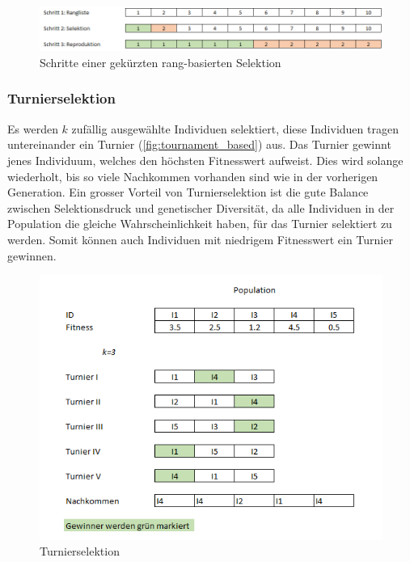         \begin{figure}[H]
          \includegraphics[width=\textwidth,center]{graphics/truncated_rank_based_selection}
          \caption{Schritte einer gekürzten rang-basierten Selektion\label{fig:truncated_rank_based_selection}}
        \end{figure}

      \subsubsection{Turnierselektion\label{subsub:Turnier}}

        Es werden \(k\) zufällig ausgewählte Individuen selektiert,
        diese Individuen tragen untereinander ein Turnier (\vref{fig:tournament_based}) aus.
        Das Turnier gewinnt jenes Individuum, welches den höchsten Fitnesswert aufweist.
        Dies wird solange wiederholt, bis so viele Nachkommen vorhanden sind wie in der vorherigen Generation.
        Ein grosser Vorteil von Turnierselektion ist die gute Balance zwischen
        Selektionsdruck und genetischer Diversität,
        da alle Individuen in der Population die gleiche Wahrscheinlichkeit haben, für das Turnier selektiert zu werden.
        Somit können auch Individuen mit niedrigem Fitnesswert ein Turnier gewinnen.

        \begin{figure}[H]
          \includegraphics[scale=1,center]{graphics/tournament_based}
          \caption{Turnierselektion\label{fig:tournament_based}}
        \end{figure}

